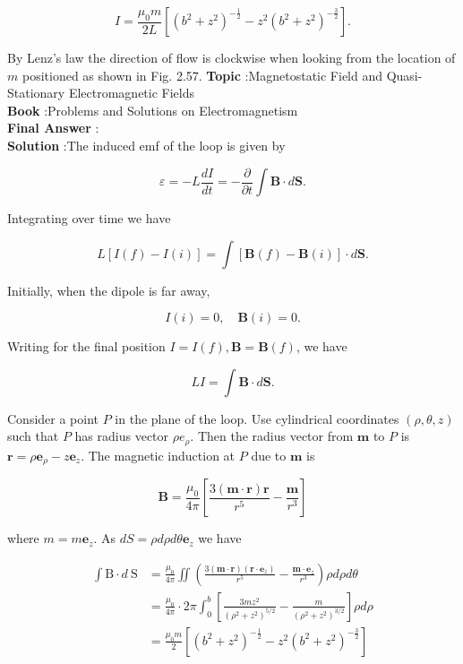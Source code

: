 \documentclass[10pt]{article}
\begin{document}
$$
I=\frac{\mu_{0} m}{2 L}\left[\left(b^{2}+z^{2}\right)^{-\frac{1}{2}}-z^{2}\left(b^{2}+z^{2}\right)^{-\frac{3}{2}}\right] .
$$

By Lenz's law the direction of flow is clockwise when looking from the location of $m$ positioned as shown in Fig. 2.57.
\textbf{Topic} :Magnetostatic Field and Quasi-Stationary Electromagnetic Fields\\
\textbf{Book} :Problems and Solutions on Electromagnetism\\
\textbf{Final Answer} :\\


\textbf{Solution} :The induced emf of the loop is given by

$$
\varepsilon=-L \frac{d I}{d t}=-\frac{\partial}{\partial t} \int \mathbf{B} \cdot d \mathbf{S} .
$$

Integrating over time we have

$$
L[I(f)-I(i)]=\int[\mathbf{B}(f)-\mathbf{B}(i)] \cdot d \mathbf{S} .
$$

Initially, when the dipole is far away,

$$
I(i)=0, \quad \mathbf{B}(i)=0 .
$$

Writing for the final position $I=I(f), \mathbf{B}=\mathbf{B}(f)$, we have

$$
L I=\int \mathbf{B} \cdot d \mathbf{S} .
$$

Consider a point $P$ in the plane of the loop. Use cylindrical coordinates $(\rho, \theta, z)$ such that $P$ has radius vector $\rho e_{\rho}$. Then the radius vector from $\mathbf{m}$ to $P$ is $\mathbf{r}=\rho \mathbf{e}_{\rho}-z \mathbf{e}_{z}$. The magnetic induction at $P$ due to $\mathbf{m}$ is

$$
\mathbf{B}=\frac{\mu_{0}}{4 \pi}\left[\frac{3(\mathbf{m} \cdot \mathbf{r}) \mathbf{r}}{r^{5}}-\frac{\mathbf{m}}{r^{3}}\right]
$$

where $m=m \mathbf{e}_{z}$. As $d S=\rho d \rho d \theta \mathbf{e}_{z}$ we have

$$
\begin{aligned}
\int \mathrm{B} \cdot d \mathrm{~S} &=\frac{\mu_{0}}{4 \pi} \iint\left(\frac{3(\mathbf{m} \cdot \mathbf{r})\left(\mathbf{r} \cdot \mathbf{e}_{z}\right)}{r^{5}}-\frac{\mathbf{m} \cdot \mathbf{e}_{z}}{r^{3}}\right) \rho d \rho d \theta \\
&=\frac{\mu_{0}}{4 \pi} \cdot 2 \pi \int_{0}^{b}\left[\frac{3 m z^{2}}{\left(\rho^{2}+z^{2}\right)^{5 / 2}}-\frac{m}{\left(\rho^{2}+z^{2}\right)^{3 / 2}}\right] \rho d \rho \\
&=\frac{\mu_{0} m}{2}\left[\left(b^{2}+z^{2}\right)^{-\frac{1}{2}}-z^{2}\left(b^{2}+z^{2}\right)^{-\frac{3}{2}}\right]
\end{aligned}
$$
\end{document}
